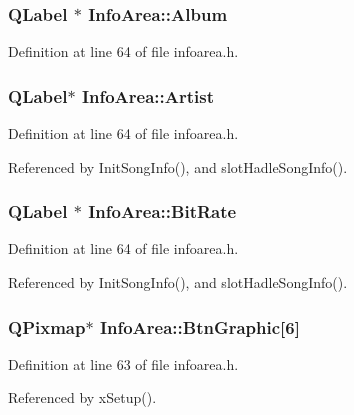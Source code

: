 \subsubsection{\setlength{\rightskip}{0pt plus 5cm}QLabel $\ast$ {\bf Info\-Area::Album}\hspace{0.3cm}{\tt  [private]}}\label{classInfoArea_InfoArear3}




Definition at line 64 of file infoarea.h.
\subsubsection{\setlength{\rightskip}{0pt plus 5cm}QLabel$\ast$ {\bf Info\-Area::Artist}\hspace{0.3cm}{\tt  [private]}}\label{classInfoArea_InfoArear2}




Definition at line 64 of file infoarea.h.

Referenced by Init\-Song\-Info(), and slot\-Hadle\-Song\-Info().
\subsubsection{\setlength{\rightskip}{0pt plus 5cm}QLabel $\ast$ {\bf Info\-Area::Bit\-Rate}\hspace{0.3cm}{\tt  [private]}}\label{classInfoArea_InfoArear7}




Definition at line 64 of file infoarea.h.

Referenced by Init\-Song\-Info(), and slot\-Hadle\-Song\-Info().
\subsubsection{\setlength{\rightskip}{0pt plus 5cm}QPixmap$\ast$ {\bf Info\-Area::Btn\-Graphic}[6]\hspace{0.3cm}{\tt  [private]}}\label{classInfoArea_InfoArear1}




Definition at line 63 of file infoarea.h.

Referenced by x\-Setup().
